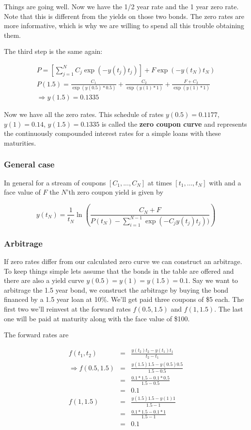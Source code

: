 Things are going well. Now we have the 1/2 year rate and the 1 year zero rate. Note that this is different from the yields on those two bonds. The zero rates are more informative, which is why we are willing to spend all this trouble obtaining them.

The third step is the same again:

\begin{eqnarray*}
P = \left[\sum_{j=1}^N C_j\exp(-y(t_j)t_j)\right] + F \exp(-y(t_N)t_N)\\
P(1.5) = \frac{C_1}{\exp(y(0.5)*0.5)} +\frac{C_2}{\exp(y(1)*1)}+\frac{F+C_3}{\exp(y(1)*1)}\\
\Rightarrow y(1.5) = 0.1335
\end{eqnarray*}

Now we have all the zero rates. This schedule of rates $y(0.5) = 0.1177$, $y(1)=0.14$, $y(1.5) = 0.1335$ is called the \textbf{zero coupon curve} and represents the continuously compounded interest rates for a simple loans with these maturities.

\subsubsection{General case}
In general for a stream of coupons $[C_1,...,C_N]$ at times $[t_1,\ldots,t_N]$ with and a face value of $F$ the $N$'th zero coupon yield is given by

\begin{equation}
y(t_N) = \frac{1}{t_N} \ln \left( \frac{C_N +F}{P(t_N)-\sum_{i=1}^{N-1}\exp(-C_{j}y(t_j)t_j))} \right)
\end{equation}

\subsubsection{Arbitrage}

If zero rates differ from our calculated zero curve we can construct an arbitrage. To keep things simple lets assume that the bonds in the table are offered and there are also a yield curve $y(0.5)=y(1)=y(1.5)=0.1$. Say we want to arbitrage the 1.5 year bond, we construct the arbitrage by buying the bond financed by a 1.5 year loan at 10\%. We'll get paid three coupons of \$5 each. The first two we'll reinvest at the forward rates $f(0.5,1.5)$ and $f(1,1.5)$. The last one will be paid at maturity along with the face value of \$100.

The forward rates are 

\begin{eqnarray*}
f(t_1,t_2) &=& \frac{y(t_2)t_2-y(t_1)t_1}{t_2-t_1}\\
\Rightarrow f(0.5,1.5) &=& \frac{y(1.5)1.5-y(0.5)0.5}{1.5-0.5}\\
&=& \frac{0.1*1.5-0.1*0.5}{1.5-0.5}\\
&=& 0.1\\
            f(1,1.5) &=& \frac{y(1.5)1.5-y(1)1}{1.5-1}\\
            &=& \frac{0.1*1.5-0.1*1}{1.5-1}\\
            &=& 0.1
\end{eqnarray*}


